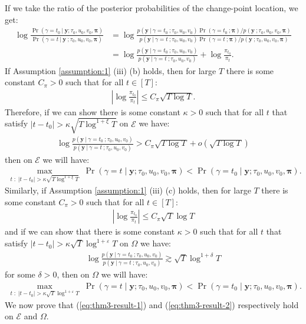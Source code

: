 If we take the ratio of the posterior probabilities of the change-point location, we get:
\begin{align*}
    \log \frac{\Pr(\gamma = t_0  \:|\: \mathbf{y} ; \tau_0, u_0, v_0,\boldsymbol{\pi})}{\Pr(\gamma = t  \:|\: \mathbf{y} \:; \tau_0, u_0, v_0,\boldsymbol{\pi})} &=  \log \frac{p(\mathbf{y} \:|\:\gamma = t_0 \:; \tau_0, u_0, v_0)\Pr(\gamma = t_0 \:; \boldsymbol{\pi})/ p(\mathbf{y}\:;\tau_0, u_0, v_0,\boldsymbol{\pi})}{p(\mathbf{y} \:|\:\gamma = t \:; \tau_0, u_0, v_0)\Pr(\gamma = t \:;\boldsymbol{\pi})/ p(\mathbf{y}\:;\tau_0, u_0, v_0,\boldsymbol{\pi})} \tag{Bayes' rule} \\
    &= \log \frac{p(\mathbf{y} \:|\:\gamma = t_0 \:; \tau_0, u_0, v_0)}{p(\mathbf{y} \:|\:\gamma = t \:; \tau_0, u_0, v_0)} + \log\frac{\pi_{t_0}}{\pi_t}.
\end{align*}
If Assumption \ref{assumption:1} (iii) (b) holds, then for large $T$ there is some constant $C_\pi > 0$ such that for all $t \in [T]$: 
\begin{align}\label{eq:thm3-prior-bd-1}
    \left|\log \frac{\pi_{t_0}}{\pi_t}\right| \leq C_\pi \sqrt{T \log T}.
\end{align}
Therefore, if we can show there is some constant $\kappa > 0$ such that for all $t$ that satisfy $|t - t_0| > \kappa \sqrt{T \log^{1+\xi}T}$ on $\mathcal{E}$ we have:
\begin{align}
    \log \frac{p(\mathbf{y} \:|\:\gamma = t_0 \:; \tau_0, u_0, v_0)}{p(\mathbf{y} \:|\:\gamma = t \:; \tau_0, u_0, v_0)} > C_\pi \sqrt{T \log T} + o\left(\sqrt{T \log T}\right) \label{eq:thm3-result-1}
\end{align}
then on $\mathcal{E}$ we will have:
\begin{align*}
    \max_{t \;:\; |t - t_0| > \kappa \sqrt{T\log^{1+\xi} T}} \; \Pr(\gamma = t  \;|\; \mathbf{y} ; \tau_0, u_0, v_0,\boldsymbol{\pi}) < \Pr(\gamma = t_0  \;|\; \mathbf{y} ; \tau_0, u_0, v_0,\boldsymbol{\pi}).
\end{align*}
Similarly, if Assumption \ref{assumption:1} (iii) (c) holds, then for large $T$ there is some constant $C_\pi > 0$ such that for all $t \in [T]$: 
\begin{align}\label{eq:thm3-prior-bd-1}
    \left|\log \frac{\pi_{t_0}}{\pi_t}\right| \leq C_\pi \sqrt{T}\log T
\end{align}
and if we can show that there is some constant $\kappa > 0$ such that for all $t$ that satisfy $|t - t_0| > \kappa\sqrt{T}\log^{1+\varepsilon} T$ on $\Omega$ we have:
\begin{align}
    \log \frac{p(\mathbf{y} \:|\:\gamma = t_0 \:; \tau_0, u_0, v_0)}{p(\mathbf{y} \:|\:\gamma = t \:; \tau_0, u_0, v_0)}\gtrsim \sqrt{T}\log^{1+\delta} T \label{eq:thm3-result-2}
\end{align}
for some $\delta > 0$, then on $\Omega$ we will have:
\begin{align*}
    \max_{t \;:\; |t - t_0| > \kappa \sqrt{T}\log^{1+\varepsilon} T} \; \Pr(\gamma = t  \;|\; \mathbf{y} ; \tau_0, u_0, v_0,\boldsymbol{\pi}) < \Pr(\gamma = t_0  \;|\; \mathbf{y} ; \tau_0, u_0, v_0,\boldsymbol{\pi}).
\end{align*}
We now prove that (\ref{eq:thm3-result-1}) and (\ref{eq:thm3-result-2}) respectively hold on $\mathcal{E}$ and $\Omega$.

